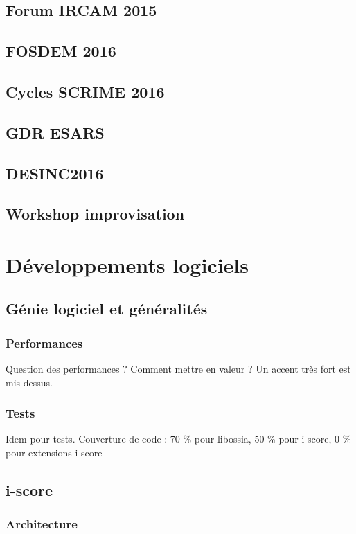 \documentclass[french,a4paper]{book}
\begin{document}
\subsection{Forum IRCAM 2015}
\subsection{FOSDEM 2016}
\subsection{Cycles SCRIME 2016}
\subsection{GDR ESARS}
\subsection{DESINC2016}
\subsection{Workshop improvisation}

\section{Développements logiciels}

\subsection{Génie logiciel et généralités}
\subsubsection{Performances}
Question des performances ? Comment mettre en valeur ? 
Un accent très fort est mis dessus.

\subsubsection{Tests}
Idem pour tests.
Couverture de code : 70 \% pour libossia, 50 \% pour i-score, 0 \% pour extensions i-score

\subsection{i-score}
\subsubsection{Architecture}
\end{document}
